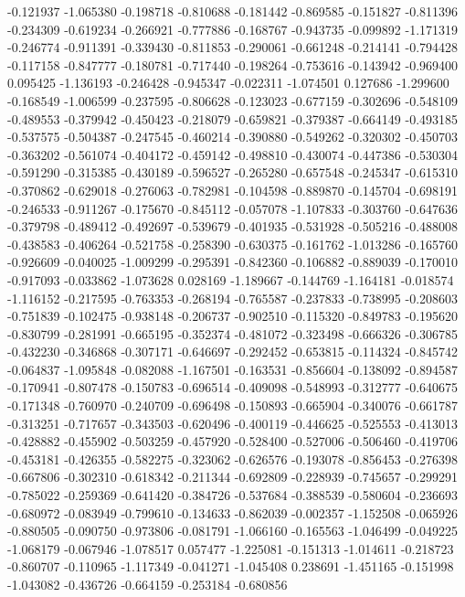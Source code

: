 -0.121937
-1.065380
-0.198718
-0.810688
-0.181442
-0.869585
-0.151827
-0.811396
-0.234309
-0.619234
-0.266921
-0.777886
-0.168767
-0.943735
-0.099892
-1.171319
-0.246774
-0.911391
-0.339430
-0.811853
-0.290061
-0.661248
-0.214141
-0.794428
-0.117158
-0.847777
-0.180781
-0.717440
-0.198264
-0.753616
-0.143942
-0.969400
0.095425
-1.136193
-0.246428
-0.945347
-0.022311
-1.074501
0.127686
-1.299600
-0.168549
-1.006599
-0.237595
-0.806628
-0.123023
-0.677159
-0.302696
-0.548109
-0.489553
-0.379942
-0.450423
-0.218079
-0.659821
-0.379387
-0.664149
-0.493185
-0.537575
-0.504387
-0.247545
-0.460214
-0.390880
-0.549262
-0.320302
-0.450703
-0.363202
-0.561074
-0.404172
-0.459142
-0.498810
-0.430074
-0.447386
-0.530304
-0.591290
-0.315385
-0.430189
-0.596527
-0.265280
-0.657548
-0.245347
-0.615310
-0.370862
-0.629018
-0.276063
-0.782981
-0.104598
-0.889870
-0.145704
-0.698191
-0.246533
-0.911267
-0.175670
-0.845112
-0.057078
-1.107833
-0.303760
-0.647636
-0.379798
-0.489412
-0.492697
-0.539679
-0.401935
-0.531928
-0.505216
-0.488008
-0.438583
-0.406264
-0.521758
-0.258390
-0.630375
-0.161762
-1.013286
-0.165760
-0.926609
-0.040025
-1.009299
-0.295391
-0.842360
-0.106882
-0.889039
-0.170010
-0.917093
-0.033862
-1.073628
0.028169
-1.189667
-0.144769
-1.164181
-0.018574
-1.116152
-0.217595
-0.763353
-0.268194
-0.765587
-0.237833
-0.738995
-0.208603
-0.751839
-0.102475
-0.938148
-0.206737
-0.902510
-0.115320
-0.849783
-0.195620
-0.830799
-0.281991
-0.665195
-0.352374
-0.481072
-0.323498
-0.666326
-0.306785
-0.432230
-0.346868
-0.307171
-0.646697
-0.292452
-0.653815
-0.114324
-0.845742
-0.064837
-1.095848
-0.082088
-1.167501
-0.163531
-0.856604
-0.138092
-0.894587
-0.170941
-0.807478
-0.150783
-0.696514
-0.409098
-0.548993
-0.312777
-0.640675
-0.171348
-0.760970
-0.240709
-0.696498
-0.150893
-0.665904
-0.340076
-0.661787
-0.313251
-0.717657
-0.343503
-0.620496
-0.400119
-0.446625
-0.525553
-0.413013
-0.428882
-0.455902
-0.503259
-0.457920
-0.528400
-0.527006
-0.506460
-0.419706
-0.453181
-0.426355
-0.582275
-0.323062
-0.626576
-0.193078
-0.856453
-0.276398
-0.667806
-0.302310
-0.618342
-0.211344
-0.692809
-0.228939
-0.745657
-0.299291
-0.785022
-0.259369
-0.641420
-0.384726
-0.537684
-0.388539
-0.580604
-0.236693
-0.680972
-0.083949
-0.799610
-0.134633
-0.862039
-0.002357
-1.152508
-0.065926
-0.880505
-0.090750
-0.973806
-0.081791
-1.066160
-0.165563
-1.046499
-0.049225
-1.068179
-0.067946
-1.078517
0.057477
-1.225081
-0.151313
-1.014611
-0.218723
-0.860707
-0.110965
-1.117349
-0.041271
-1.045408
0.238691
-1.451165
-0.151998
-1.043082
-0.436726
-0.664159
-0.253184
-0.680856
